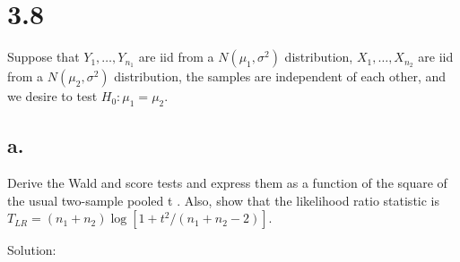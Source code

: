 \documentclass[
  letterpaper,
  DIV=11,
  numbers=noendperiod]{scrreprt}
\begin{document}
\newpage

\hypertarget{section-21}{%
\section{3.8}\label{section-21}}

Suppose that \(Y_1,\dots, Y_{n_1}\) are iid from a \(N(\mu_1,\sigma^2)\)
distribution, \(X_1,\dots,X_{n_2}\) are iid from a \(N(\mu_2,\sigma^2)\)
distribution, the samples are independent of each other, and we desire
to test \(H_0:\mu_1=\mu_2\).

\hypertarget{a.-5}{%
\subsection{a.}\label{a.-5}}

Derive the Wald and score tests and express them as a function of the
square of the usual two-sample pooled t . Also, show that the likelihood
ratio statistic is \(T_{LR} = (n_1+n_2)\log[1+t^2/(n_1+n_2-2)]\).

Solution:
\end{document}
